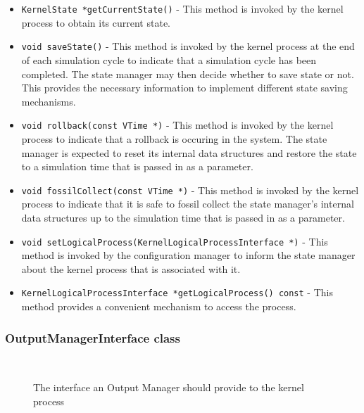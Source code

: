 \begin{itemize}

\item {\tt KernelState *getCurrentState()} - This method is invoked by the
  kernel process to obtain its current state.

\item {\tt void saveState()} - This method is invoked by the kernel
  process at the end of each simulation cycle to indicate that a
  simulation cycle has been completed. The state manager may then decide
  whether to save state or not.  This provides the necessary information
  to implement different state saving mechanisms.

\item {\tt void rollback(const VTime *)} - This method is invoked by the
  kernel process to indicate that a rollback is occuring in the
  system. The state manager is expected to reset its internal data
  structures and restore the state to a simulation time that is passed
  in as a parameter.

\item {\tt void fossilCollect(const VTime *)} - This method is invoked by
  the kernel process to indicate that it is safe to fossil collect the
  state manager's internal data structures up to the simulation time that
  is passed in as a parameter.

\item {\tt void setLogicalProcess(KernelLogicalProcessInterface *)} - This
  method is invoked by the configuration manager to inform the state
  manager about the kernel process that is associated with it.

\item {\tt KernelLogicalProcessInterface *getLogicalProcess() const} -
  This method provides a convenient mechanism to access the process.
\end{itemize}

\subsubsection{OutputManagerInterface class}

\begin{figure*}
\begin{center}
\ 
\end{center}
\caption{The interface an Output Manager should provide to the kernel
  process}\label{fig:OutputManagerInterface}
\end{figure*}

